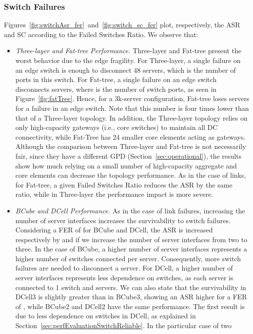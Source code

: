 \subsubsection{Switch Failures}
\label{sec:perfEvaluationSwitchSurvival}

Figures~\ref{fig:switchAsr_fer}~and~\ref{fig:switch_sc_fer} plot, respectively, the ASR and SC according to the Failed Switches Ratio. We observe that:
\begin{itemize}
\item \textit{Three-layer and Fat-tree Performance.} Three-layer and Fat-tree present the worst behavior due to the edge fragility. For Three-layer, a single failure on an edge switch is enough to disconnect 48 servers, which is the number of ports in this switch. For Fat-tree, a single failure on an edge switch disconnects  servers, where  is the number of switch ports, as seen in Figure~\ref{fig:fatTree}. Hence, for a 3k-server configuration, Fat-tree loses  servers for a failure in an edge switch. Note that this number is four times lower than that of a Three-layer topology.
In addition, the Three-layer topology relies on only high-capacity gateways (i.e., core switches) to maintain all DC connectivity, while Fat-Tree has 24 smaller core elements acting as gateways. Although the comparison between Three-layer and Fat-tree is not necessarily fair, since they have a different GPD (Section~\ref{sec:operational}), the results show how much relying on a small number of high-capacity aggregate and core elements can decrease the topology performance.
As in the case of links, for Fat-tree, a given Failed Switches Ratio reduces the ASR by the same ratio, while in Three-layer the performance impact is more severe.
\item \textit{BCube and DCell Performance.} As in the case of link failures, increasing the number of server interfaces increases the survivability to switch failures. Considering a FER of  for BCube and DCell, the ASR is increased respectively by  and  if we increase the number of server interfaces from two to three. In the case of BCube, a higher number of server interfaces represents a higher number of switches connected per server. Consequently, more switch failures are needed to disconnect a server. For DCell, a higher number of server interfaces represents less dependence on switches, as each server is connected to 1 switch and  servers. We can also state that the survivability in DCell3 is slightly greater than in BCube3, showing an ASR  higher for a FER of , while BCube2 and DCell2 have the same performance. The first result is due to less dependence on switches in DCell, as explained in Section~\ref{sec:perfEvaluationSwitchReliable}. In the particular case of two 

\end{itemize}
